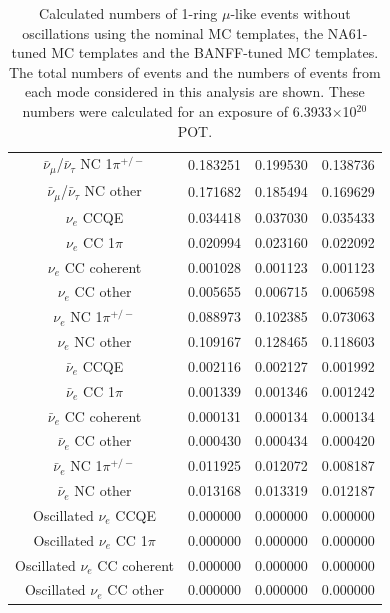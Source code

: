 \begin{table}
\begin{tabular}{| c | c | c | c | }
$\bar{\nu}_{\mu}$/$\bar{\nu}_{\tau}$ NC 1$\pi^{+/-}$   &   0.183251   &   0.199530  &   0.138736 \\
$\bar{\nu}_{\mu}$/$\bar{\nu}_{\tau}$ NC other          &   0.171682   &   0.185494  &   0.169629 \\
$\nu_e$ CCQE                                           &   0.034418   &   0.037030  &   0.035433 \\
$\nu_e$ CC 1$\pi$                                      &   0.020994   &   0.023160  &   0.022092 \\
$\nu_e$ CC coherent                                    &   0.001028   &   0.001123  &   0.001123 \\
$\nu_e$ CC other                                       &   0.005655   &   0.006715  &   0.006598 \\
$\nu_e$ NC 1$\pi^{+/-}$                                &   0.088973   &   0.102385  &   0.073063 \\
$\nu_e$ NC other                                       &   0.109167   &   0.128465  &   0.118603 \\
$\bar{\nu}_{e}$ CCQE                                   &   0.002116   &   0.002127  &   0.001992 \\
$\bar{\nu}_{e}$ CC 1$\pi$                              &   0.001339   &   0.001346  &   0.001242 \\
$\bar{\nu}_{e}$ CC coherent                            &   0.000131   &   0.000134  &   0.000134 \\
$\bar{\nu}_{e}$ CC other                               &   0.000430   &   0.000434  &   0.000420 \\
$\bar{\nu}_{e}$ NC 1$\pi^{+/-}$                        &   0.011925   &   0.012072  &   0.008187 \\
$\bar{\nu}_{e}$ NC other                               &   0.013168   &   0.013319  &   0.012187 \\
Oscillated $\nu_e$ CCQE                                &   0.000000   &   0.000000  &   0.000000 \\
Oscillated $\nu_e$ CC 1$\pi$                           &   0.000000   &   0.000000  &   0.000000 \\
Oscillated $\nu_e$ CC coherent                         &   0.000000   &   0.000000  &   0.000000 \\
Oscillated $\nu_e$ CC other                            &   0.000000   &   0.000000  &   0.000000 \\
\hline
\end{tabular}
\caption{
  Calculated numbers of 1-ring $\mu$-like events without oscillations using the nominal MC templates, the
  NA61-tuned MC templates and the BANFF-tuned MC templates.
  The total numbers of events and the numbers of events from each mode considered in this analysis are shown.
  These numbers were calculated for an exposure of 6.3933$\times$10$^{20}$ POT.
}
\label{tab:nsk_nominal_x3_no_osc}
\end{table}


